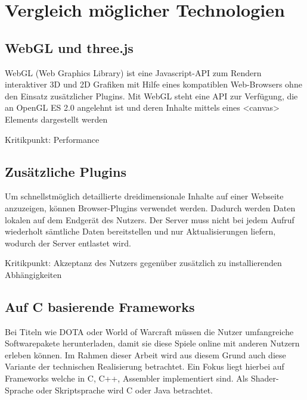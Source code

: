 
\chapter{Vergleich möglicher Technologien}


\section{WebGL und three.js}

WebGL (Web Graphics Library) ist eine Javascript-API zum Rendern interaktiver 3D und 2D Grafiken mit Hilfe eines kompatiblen Web-Browsers ohne den Einsatz zusätzlicher Plugins. Mit WebGL steht eine API zur Verfügung, die an OpenGL ES 2.0 angelehnt ist und deren Inhalte mittels eines <canvas> Elements dargestellt werden

Kritikpunkt: Performance


\section{Zusätzliche Plugins}

Um schnellstmöglich detaillierte dreidimensionale Inhalte auf einer Webseite anzuzeigen, können Browser-Plugins verwendet werden. Dadurch werden Daten lokalen auf dem Endgerät des Nutzers. Der Server muss nicht bei jedem Aufruf wiederholt sämtliche Daten bereitstellen und nur Aktualisierungen liefern, wodurch der Server entlastet wird.

Kritikpunkt: Akzeptanz des Nutzers gegenüber zusätzlich zu installierenden Abhängigkeiten


\section{Auf C basierende Frameworks}

Bei Titeln wie DOTA oder World of Warcraft müssen die Nutzer umfangreiche Softwarepakete herunterladen, damit sie diese Spiele online mit anderen Nutzern erleben können. Im Rahmen dieser Arbeit wird aus diesem Grund auch diese Variante der technischen Realisierung betrachtet. Ein Fokus liegt hierbei auf Frameworks welche in C, C++, Assembler implementiert sind. Als Shader-Sprache oder Skriptsprache wird C oder Java betrachtet.

